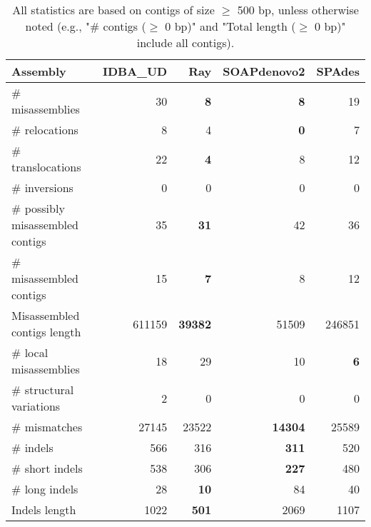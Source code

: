 \documentclass[12pt,a4paper]{article}
\begin{document}
\begin{table}[ht]
\begin{center}
\caption{All statistics are based on contigs of size $\geq$ 500 bp, unless otherwise noted (e.g., "\# contigs ($\geq$ 0 bp)" and "Total length ($\geq$ 0 bp)" include all contigs).}
\begin{tabular}{|l*{4}{|r}|}
\hline
Assembly & IDBA\_UD & Ray & SOAPdenovo2 & SPAdes \\ \hline
\# misassemblies & 30 & {\bf 8} & {\bf 8} & 19 \\ \hline
\hspace{5mm}\# relocations & 8 & 4 & {\bf 0} & 7 \\ \hline
\hspace{5mm}\# translocations & 22 & {\bf 4} & 8 & 12 \\ \hline
\hspace{5mm}\# inversions & 0 & 0 & 0 & 0 \\ \hline
\# possibly misassembled contigs & 35 & {\bf 31} & 42 & 36 \\ \hline
\# misassembled contigs & 15 & {\bf 7} & 8 & 12 \\ \hline
Misassembled contigs length & 611159 & {\bf 39382} & 51509 & 246851 \\ \hline
\# local misassemblies & 18 & 29 & 10 & {\bf 6} \\ \hline
\# structural variations & 2 & 0 & 0 & 0 \\ \hline
\# mismatches & 27145 & 23522 & {\bf 14304} & 25589 \\ \hline
\# indels & 566 & 316 & {\bf 311} & 520 \\ \hline
\hspace{5mm}\# short indels & 538 & 306 & {\bf 227} & 480 \\ \hline
\hspace{5mm}\# long indels & 28 & {\bf 10} & 84 & 40 \\ \hline
Indels length & 1022 & {\bf 501} & 2069 & 1107 \\ \hline
\end{tabular}
\end{center}
\end{table}
\end{document}
